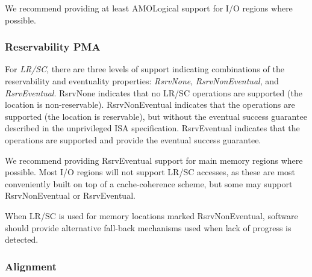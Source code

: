 \begin{commentary}
We recommend providing at least AMOLogical support for I/O regions
where possible.
\end{commentary}

\subsubsection{Reservability PMA}

For {\em LR/SC}, there are three levels of support indicating combinations of
the reservability and eventuality properties:  {\em RsrvNone},
{\em RsrvNonEventual}, and {\em RsrvEventual}.
RsrvNone indicates that no LR/SC operations are supported (the location is
non-reservable).  RsrvNonEventual indicates that the operations are supported
(the location is reservable), but without the eventual success guarantee
described in the unprivileged ISA specification.  RsrvEventual indicates that
the operations are supported and provide the eventual success guarantee.

\begin{commentary}
We recommend providing RsrvEventual support for main memory regions
where possible.  Most I/O regions will not support LR/SC accesses, as
these are most conveniently built on top of a cache-coherence scheme, but some
may support RsrvNonEventual or RsrvEventual.
\end{commentary}

\begin{commentary}
When LR/SC is used for memory locations marked RsrvNonEventual, software should
provide alternative fall-back mechanisms used when lack of progress is
detected.
\end{commentary}

\subsubsection{Alignment}

